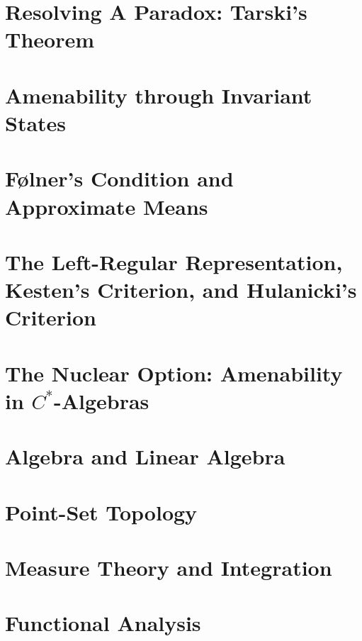 \documentclass[10pt]{package2}
\begin{document}
\chapter{Resolving A Paradox: Tarski's Theorem}\label{ch:tarskis_theorem}

\chapter{Amenability through Invariant States}\label{ch:invariant_states}

\chapter{Følner's Condition and Approximate Means}\label{ch:folner_condition}

\chapter{The Left-Regular Representation, Kesten's Criterion, and Hulanicki's Criterion}\label{ch:left_regular_representation}
\chapter{The Nuclear Option: Amenability in \texorpdfstring{$C^{\ast}$-Algebras}{C*-Algebras}}\label{ch:nuclearity}
\appendix
\chapter{Algebra and Linear Algebra}\label{ch:algebra_and_linear_algebra}

\chapter{Point-Set Topology}\label{ch:point_set_topology}

\chapter{Measure Theory and Integration}\label{ch:measure_theory}

\chapter{Functional Analysis}\label{ch:functional_analysis}

\nocite{*}
\printbibliography
\end{document}
